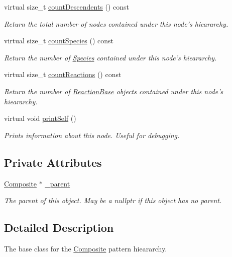 \begin{DoxyCompactItemize}
virtual size\+\_\+t \hyperlink{classComponent_a38336c92dacb78175dfc7746bde5055d}{count\+Descendents} () const 
\begin{DoxyCompactList}\small\item\em Return the total number of nodes contained under this node's hieararchy. \end{DoxyCompactList}\item 
virtual size\+\_\+t \hyperlink{classComponent_ae4b35cc8ce749e1219bec0eeea16b4bc}{count\+Species} () const 
\begin{DoxyCompactList}\small\item\em Return the number of \hyperlink{classSpecies}{Species} contained under this node's hieararchy. \end{DoxyCompactList}\item 
virtual size\+\_\+t \hyperlink{classComponent_a446ee3fa9e36a6b56642a9d2a14d983d}{count\+Reactions} () const 
\begin{DoxyCompactList}\small\item\em Return the number of \hyperlink{classReactionBase}{Reaction\+Base} objects contained under this node's hieararchy. \end{DoxyCompactList}\item 
virtual void \hyperlink{classComponent_a871fbdc783ea600ed667dd37eb8adf1e}{print\+Self} ()
\begin{DoxyCompactList}\small\item\em Prints information about this node. Useful for debugging. \end{DoxyCompactList}\end{DoxyCompactItemize}
\subsection*{Private Attributes}
\begin{DoxyCompactItemize}
\item 
\hyperlink{classComposite}{Composite} $\ast$ \hyperlink{classComponent_a74c227d53f7fd87f14421326ee63045a}{\+\_\+parent}
\begin{DoxyCompactList}\small\item\em The parent of this object. May be a nullptr if this object has no parent. \end{DoxyCompactList}\end{DoxyCompactItemize}


\subsection{Detailed Description}
The base class for the \hyperlink{classComposite}{Composite} pattern hieararchy. 

